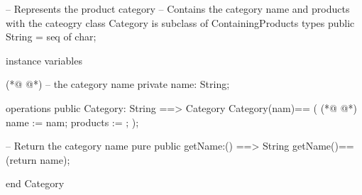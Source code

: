 \begin{vdmpp}[breaklines=true]
-- Represents the product category
-- Contains the category name and products with the cateogry
class Category is subclass of ContainingProducts
 types 
  public String = seq of char;
  
 instance variables
   
(*@
\label{Category:9}
@*)
   -- the category name
  private name: String;
   
 operations
  public Category: String ==> Category
  Category(nam)==
  (
(*@
\label{getName:16}
@*)
   name := nam;
   products := {};
  );
  
  -- Return the category name
  pure public getName:() ==> String
  getName()==(return name);
  
end Category
\end{vdmpp}
